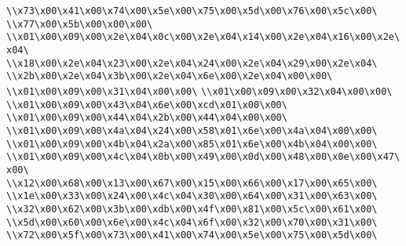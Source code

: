 \verb|\\x73\x00\x41\x00\x74\x00\x5e\x00\x75\x00\x5d\x00\x76\x00\x5c\x00\|\newline
\verb|\\x77\x00\x5b\x00\x00\x00\|\newline
\verb|\\x01\x00\x09\x00\x2e\x04\x0c\x00\x2e\x04\x14\x00\x2e\x04\x16\x00\x2e\x04\|\newline
\verb|\\x18\x00\x2e\x04\x23\x00\x2e\x04\x24\x00\x2e\x04\x29\x00\x2e\x04\|\newline
\verb|\\x2b\x00\x2e\x04\x3b\x00\x2e\x04\x6e\x00\x2e\x04\x00\x00\|\newline
\verb|\\x01\x00\x09\x00\x31\x04\x00\x00\|\newline
\verb|\\x01\x00\x09\x00\x32\x04\x00\x00\|\newline
\verb|\\x01\x00\x09\x00\x43\x04\x6e\x00\xcd\x01\x00\x00\|\newline
\verb|\\x01\x00\x09\x00\x44\x04\x2b\x00\x44\x04\x00\x00\|\newline
\verb|\\x01\x00\x09\x00\x4a\x04\x24\x00\x58\x01\x6e\x00\x4a\x04\x00\x00\|\newline
\verb|\\x01\x00\x09\x00\x4b\x04\x2a\x00\x85\x01\x6e\x00\x4b\x04\x00\x00\|\newline
\verb|\\x01\x00\x09\x00\x4c\x04\x0b\x00\x49\x00\x0d\x00\x48\x00\x0e\x00\x47\x00\|\newline
\verb|\\x12\x00\x68\x00\x13\x00\x67\x00\x15\x00\x66\x00\x17\x00\x65\x00\|\newline
\verb|\\x1e\x00\x33\x00\x24\x00\x4c\x04\x30\x00\x64\x00\x31\x00\x63\x00\|\newline
\verb|\\x32\x00\x62\x00\x3b\x00\xdb\x00\x4f\x00\x81\x00\x5c\x00\x61\x00\|\newline
\verb|\\x5d\x00\x60\x00\x6e\x00\x4c\x04\x6f\x00\x32\x00\x70\x00\x31\x00\|\newline
\verb|\\x72\x00\x5f\x00\x73\x00\x41\x00\x74\x00\x5e\x00\x75\x00\x5d\x00\|\newline
